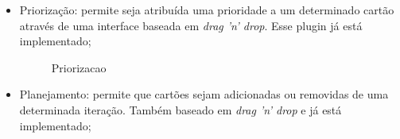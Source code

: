\begin{itemize}
	\item{Priorização: permite seja atribuída uma prioridade a um determinado cartão através de uma interface baseada em \textit{drag 'n' drop}. Esse plugin já está implementado;
	
	\begin{figure}[H]
	  \centering
	  \caption{Priorizacao}\label{figura:priorizacao}
	\end{figure}
	}
	\item{Planejamento: permite que cartões sejam adicionadas ou removidas de uma determinada iteração. Também baseado em \textit{drag 'n' drop} e já está implementado;
	
}
\end{itemize}
